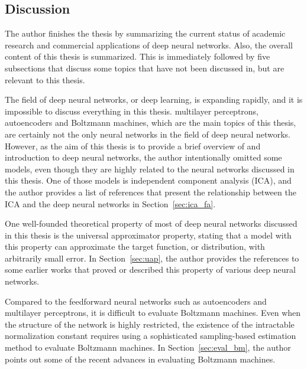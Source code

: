 \documentclass[dissertation,nocontribution]{aaltoseries}
\begin{document}
\subsection{Discussion}

The author finishes the thesis by summarizing the current
status of academic research and commercial applications of
deep neural networks. Also, the overall content of this
thesis is summarized. 
This is immediately followed by five subsections that
discuss some topics that have not been discussed
in, but are relevant to this thesis.

The field of deep neural networks, or deep learning, is
expanding rapidly, and it is impossible to discuss
everything in this thesis. multilayer perceptrons,
autoencoders and  Boltzmann machines, which are the main topics
of this thesis, are certainly not the only neural networks
in the field of deep neural networks. However, as the aim of
this thesis is to provide a brief overview of and
introduction to deep neural networks, the author
intentionally omitted some models, even though they are
highly related to the neural networks discussed in this
thesis. One of those models is independent component
analysis (ICA), and the author provides a list of references
that present the relationship between the ICA and the deep
neural networks in Section~\ref{sec:ica_fa}.

One well-founded theoretical property of most of
deep neural networks discussed in this thesis is the
universal approximator property, stating that a model with
this property can approximate the target function, or
distribution, with arbitrarily small error. In
Section~\ref{sec:uap}, the author provides the references to
some earlier works that proved or described this property of
various deep neural networks.

Compared to the feedforward neural networks such as
autoencoders and multilayer perceptrons, it is difficult to
evaluate Boltzmann machines. Even when the structure of the
network is highly restricted, the existence of the
intractable normalization constant requires using a
sophisticated sampling-based estimation method to evaluate
Boltzmann machines. In Section~\ref{sec:eval_bm}, the author
points out some of the recent advances in evaluating
Boltzmann machines.
\end{document}
